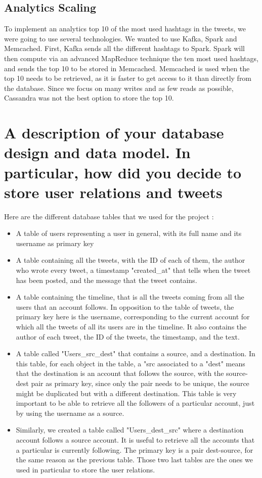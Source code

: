 \documentclass[11pt,a4paper]{article}
\begin{document}
\subsection*{Analytics Scaling}
To implement an analytics top 10 of the most used hashtags in the tweets, we were going to use several technologies. We wanted to use Kafka, Spark and Memcached. First, Kafka sends all the different hashtags to Spark. Spark will then compute via an advanced MapReduce technique the ten most used hashtags, and sends the top 10 to be stored in Memcached. Memcached is used when the top 10 needs to be retrieved, as it is faster to get access to it than directly from the database. Since we focus on many writes and as few reads as possible, Cassandra was not the best option to store the top 10. 

\section{A description of your database design and data model. In particular, how did you decide to store user relations and tweets}
Here are the different database tables that we used for the project : 
\begin{itemize}
\item A table of users representing a user in general, with its full name and its username as primary key
\item A table containing all the tweets, with the ID of each of them, the author who wrote every tweet, a timestamp "created\_at" that tells when the tweet has been posted, and the message that the tweet contains. 
\item A table containing the timeline, that is all the tweets coming from all the users that an account follows. In opposition to the table of tweets, the primary key here is the username, corresponding to the current account for which all the tweets of all its users are in the timeline. It also contains the author of each tweet, the ID of the tweets, the timestamp, and the text.
\item A table called "Users\_src\_dest" that contains a source, and a destination. In this table, for each object in the table, a "src associated to a "dest" means that the destination is an account that follows the source, with the source-dest pair as primary key, since only the pair needs to be unique, the source might be duplicated but with a different destination. This table is very important to be able to retrieve all the followers of a particular account, just by using the username as a source.
\item Similarly, we created a table called "Users\_dest\_src" where a destination account follows a source account. It is useful to retrieve all the accounts that a particular is currently following. The primary key is a pair dest-source, for the same reason as the previous table. Those two last tables are the ones we used in particular to store the user relations.
\end{itemize}
\end{document}
